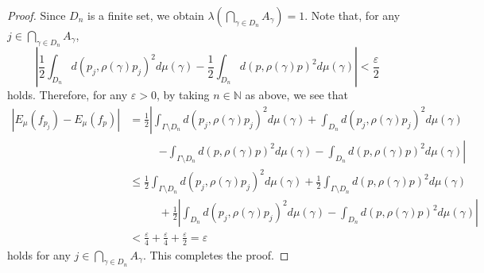 \documentclass[12pt]{amsart}
\numberwithin{equation}{section}
\theoremstyle{plain}
\theoremstyle{definition}
\theoremstyle{remark}
\newcommand{\N}{{\mathbb N}}
\newcommand{\ene}[1]{E_{#1}}
\begin{document}
\begin{proof}
 Since $D_n$ is a finite set, we obtain 
 $\lambda (\bigcap_{\gamma \in D_n} A_{\gamma}) =1$. 
 Note that, for any $j \in \bigcap_{\gamma \in D_n} A_{\gamma}$, 
 \begin{equation*}
 \left|\frac{1}{2}\int_{D_n} d(p_j,\rho(\gamma)p_j)^2 d\mu(\gamma)
     - \frac{1}{2}\int_{D_n} d(p,\rho(\gamma)p)^2 d\mu(\gamma) \right|
 < \frac{\varepsilon}{2}
 \end{equation*}
 holds.  Therefore, for any $\varepsilon>0$, by taking $n \in \N$ as
 above, we see that
 \begin{equation*}
 \begin{split}
  \left|\ene{\mu}(f_{p_j}) - \ene{\mu}(f_p)\right|
 & = \frac{1}{2} \left| 
    \int_{\Gamma \setminus D_n} d(p_j, \rho(\gamma)p_j)^2 d\mu(\gamma) 
    + \int_{D_n} d(p_j, \rho(\gamma)p_j)^2 d\mu(\gamma) \right. \\
 & \phantom{==}   \left.
    - \int_{\Gamma \setminus D_n} d(p, \rho(\gamma)p)^2 d\mu(\gamma) 
    - \int_{D_n}d(p, \rho(\gamma)p)^2 d\mu(\gamma) 
    \right| \\
 & \leq  \frac{1}{2} \int_{\Gamma \setminus D_n} 
        d(p_j, \rho(\gamma)p_j)^2 d\mu(\gamma)
    + \frac{1}{2}\int_{\Gamma \setminus D_n} 
       d(p, \rho(\gamma)p)^2 d\mu(\gamma)  \\
 & \phantom{==}
    + \frac{1}{2}
       \left|\int_{D_n} d(p_j, \rho(\gamma)p_j)^2 d\mu(\gamma) 
       - \int_{D_n}d(p, \rho(\gamma)p)^2 d\mu(\gamma) 
      \right|\\
 & < \frac{\varepsilon}{4} + \frac{\varepsilon}{4} +
  \frac{\varepsilon}{2}= \varepsilon
 \end{split}
 \end{equation*}
 holds for any $j \in \bigcap_{\gamma \in D_n}A_{\gamma}$. 
 This completes the proof. 
\end{proof}
\end{document}
